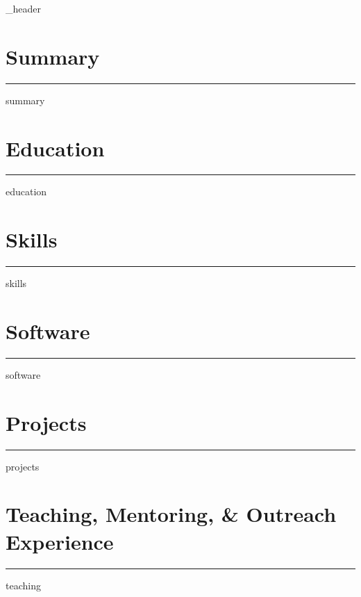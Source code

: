 \documentclass[letter,11pt]{article}
\author{Noah R. Franz}
\begin{document}
 

{_header}

\section{Summary}
\vspace*{5pt}
\hrule
\vspace*{5pt}
{summary}
\vspace*{5pt}

\section{Education}
\vspace*{5pt}
\hrule
\vspace*{5pt}
{education}
\vspace*{5pt}

\section{Skills}
\vspace*{5pt}
\hrule
\vspace*{5pt}
{skills}
\vspace*{5pt}

\section{Software}
\vspace*{5pt}
\hrule
\vspace*{5pt}
{software}
\vspace*{5pt}

\section{Projects}
\vspace*{5pt}
\hrule
\vspace*{5pt}
{projects}
\vspace*{5pt}

\section{Teaching, Mentoring, \& Outreach Experience}
\vspace*{5pt}
\hrule
\vspace*{5pt}
{teaching}
\vspace*{5pt}
\end{document}
